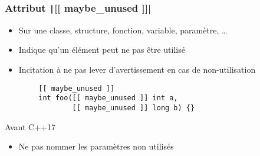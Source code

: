 \documentclass[C++.tex]{subfiles}
\begin{document}
\begin{frame}[fragile]
	\frametitle{Attribut \texttt|[[ maybe_unused ]]|}
	\begin{itemize}
		\item Sur une classe, structure, fonction, variable, paramètre, \ldots{}
		\item Indique qu'un élément peut ne pas être utilisé
		\item Incitation à ne pas lever d'avertissement en cas de non-utilisation
	\end{itemize}

	\begin{verbatim}
		[[ maybe_unused ]]
		int foo([[ maybe_unused ]] int a,
		        [[ maybe_unused ]] long b) {}
	\end{verbatim}

	\begin{block}{Avant C++17}
		\begin{itemize}
			\item Ne pas nommer les paramètres non utilisés
		\end{itemize}
	\end{block}


\end{frame}
\end{document}
